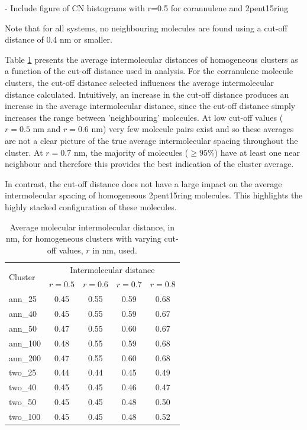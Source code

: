 - Include figure of CN histograms with r=0.5 for corannulene and 2pent15ring

Note that for all systems, no neighbouring molecules are found using a cut-off distance of 0.4 nm or smaller.


Table \ref{tableSI:intermolecdistscutoff} presents the average intermolecular distances of homogeneous clusters as a function of the cut-off distance used in analysis. For the corranulene molecule clusters, the cut-off distance selected influences the average intermolecular distance calculated.  Intuitively, an increase in the cut-off distance produces an increase in the average intermolecular distance, since the cut-off distance simply increases the range between 'neighbouring' molecules. At low cut-off values ($r = 0.5$ nm and $r = 0.6$ nm) very few molecule pairs exist and so these averages are not a clear picture of the true average intermolecular spacing throughout the cluster.  At $r = 0.7$ nm, the majority of molecules ($\ge 95$\%) have at least one near neighbour and therefore this provides the best indication of the cluster average.

In contrast, the cut-off distance does not have a large impact on the average intermolecular spacing of homogeneous 2pent15ring molecules.  This highlights the highly stacked configuration of these molecules.




% 
\begin{table}[]
\centering
\caption{Average molecular intermolecular distance, in nm, for homogeneous clusters with varying cut-off values, $r$ in nm, used.}
\label{tableSI:intermolecdistscutoff}
\begin{tabular}{lcccc}
\hline
\multicolumn{1}{l}{\multirow{2}{*}{Cluster}} & \multicolumn{4}{c}{\multirow{1}{*}{Intermolecular distance}} \\
 & $r = 0.5$ & $r = 0.6$ & $r = 0.7$ & $r = 0.8$ \\ \hline
ann\_25 & 0.45 & 0.55 & 0.59 & 0.68 \\
ann\_40 & 0.45 & 0.55 & 0.59 & 0.67 \\
ann\_50 & 0.47 & 0.55 & 0.60 & 0.67 \\
ann\_100 & 0.48 & 0.55 & 0.59 & 0.68 \\
ann\_200 & 0.47 & 0.55 & 0.60 & 0.68 \\ \hline
two\_25 & 0.44 & 0.44 & 0.45 & 0.49 \\
two\_40 & 0.45 & 0.45 & 0.46 & 0.47 \\
two\_50 & 0.45 & 0.45 & 0.48 & 0.50 \\ 
two\_100 & 0.45 & 0.45 & 0.48 & 0.52 \\ \hline
\end{tabular}
\end{table}
%





